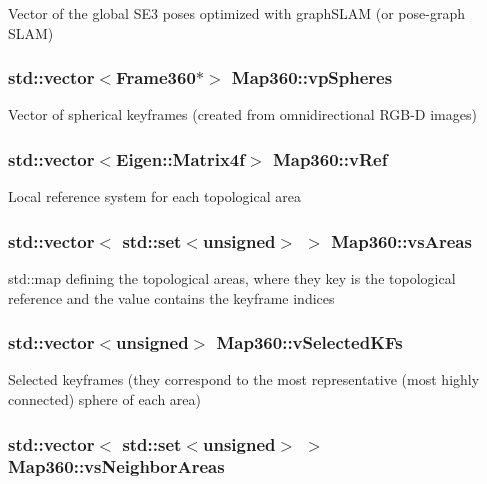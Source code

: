 Vector of the global S\-E3 poses optimized with graph\-S\-L\-A\-M (or pose-\/graph S\-L\-A\-M) \hypertarget{structMap360_ad226d3c149be805f4455722325499a0f}{
\subsubsection[{vp\-Spheres}]{\setlength{\rightskip}{0pt plus 5cm}std\-::vector$<${\bf Frame360}$\ast$$>$ Map360\-::vp\-Spheres}}\label{structMap360_ad226d3c149be805f4455722325499a0f}
Vector of spherical keyframes (created from omnidirectional R\-G\-B-\/\-D images) \hypertarget{structMap360_a1525552984f02f8438b654473c3ebf95}{
\subsubsection[{v\-Ref}]{\setlength{\rightskip}{0pt plus 5cm}std\-::vector$<$Eigen\-::\-Matrix4f$>$ Map360\-::v\-Ref}}\label{structMap360_a1525552984f02f8438b654473c3ebf95}
Local reference system for each topological area \hypertarget{structMap360_af1986f493d43729c167c094c3a9e4246}{
\subsubsection[{vs\-Areas}]{\setlength{\rightskip}{0pt plus 5cm}std\-::vector$<$ std\-::set$<$unsigned$>$ $>$ Map360\-::vs\-Areas}}\label{structMap360_af1986f493d43729c167c094c3a9e4246}
std\-::map defining the topological areas, where they key is the topological reference and the value contains the keyframe indices \hypertarget{structMap360_a3514228ffebb5d5f07dc82d5eb4f59d3}{
\subsubsection[{v\-Selected\-K\-Fs}]{\setlength{\rightskip}{0pt plus 5cm}std\-::vector$<$unsigned$>$ Map360\-::v\-Selected\-K\-Fs}}\label{structMap360_a3514228ffebb5d5f07dc82d5eb4f59d3}
Selected keyframes (they correspond to the most representative (most highly connected) sphere of each area) \hypertarget{structMap360_a3065898bde0f1cfe47bb5f3012c81d2b}{
\subsubsection[{vs\-Neighbor\-Areas}]{\setlength{\rightskip}{0pt plus 5cm}std\-::vector$<$ std\-::set$<$unsigned$>$ $>$ Map360\-::vs\-Neighbor\-Areas}}\label{structMap360_a3065898bde0f1cfe47bb5f3012c81d2b}
